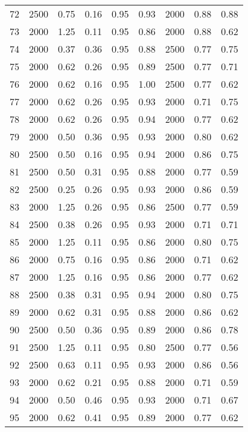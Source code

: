 \begin{longtable}[c]{ccccccccc}
72  &  2500 &  0.75 &  0.16 &  0.95 &  0.93 &  2000 &  0.88 &  0.88 \\
73  &  2000 &  1.25 &  0.11 &  0.95 &  0.86 &  2000 &  0.88 &  0.62 \\
74  &  2000 &  0.37 &  0.36 &  0.95 &  0.88 &  2500 &  0.77 &  0.75 \\
75  &  2000 &  0.62 &  0.26 &  0.95 &  0.89 &  2500 &  0.77 &  0.71 \\
76  &  2000 &  0.62 &  0.16 &  0.95 &  1.00 &  2500 &  0.77 &  0.62 \\
77  &  2000 &  0.62 &  0.26 &  0.95 &  0.93 &  2000 &  0.71 &  0.75 \\
78  &  2000 &  0.62 &  0.26 &  0.95 &  0.94 &  2000 &  0.77 &  0.62 \\
79  &  2000 &  0.50 &  0.36 &  0.95 &  0.93 &  2000 &  0.80 &  0.62 \\
80  &  2500 &  0.50 &  0.16 &  0.95 &  0.94 &  2000 &  0.86 &  0.75 \\
81  &  2500 &  0.50 &  0.31 &  0.95 &  0.88 &  2000 &  0.77 &  0.59 \\
82  &  2500 &  0.25 &  0.26 &  0.95 &  0.93 &  2000 &  0.86 &  0.59 \\
83  &  2000 &  1.25 &  0.26 &  0.95 &  0.86 &  2500 &  0.77 &  0.59 \\
84  &  2500 &  0.38 &  0.26 &  0.95 &  0.93 &  2000 &  0.71 &  0.71 \\
85  &  2000 &  1.25 &  0.11 &  0.95 &  0.86 &  2000 &  0.80 &  0.75 \\
86  &  2000 &  0.75 &  0.16 &  0.95 &  0.86 &  2000 &  0.71 &  0.62 \\
87  &  2000 &  1.25 &  0.16 &  0.95 &  0.86 &  2000 &  0.77 &  0.62 \\
88  &  2500 &  0.38 &  0.31 &  0.95 &  0.94 &  2000 &  0.80 &  0.75 \\
89  &  2000 &  0.62 &  0.31 &  0.95 &  0.88 &  2000 &  0.86 &  0.62 \\
90  &  2500 &  0.50 &  0.36 &  0.95 &  0.89 &  2000 &  0.86 &  0.78 \\
91  &  2500 &  1.25 &  0.11 &  0.95 &  0.80 &  2500 &  0.77 &  0.56 \\
92  &  2500 &  0.63 &  0.11 &  0.95 &  0.93 &  2000 &  0.86 &  0.56 \\
93  &  2000 &  0.62 &  0.21 &  0.95 &  0.88 &  2000 &  0.71 &  0.59 \\
94  &  2000 &  0.50 &  0.46 &  0.95 &  0.93 &  2000 &  0.71 &  0.67 \\
95  &  2000 &  0.62 &  0.41 &  0.95 &  0.89 &  2000 &  0.77 &  0.62 \\

\end{longtable}
